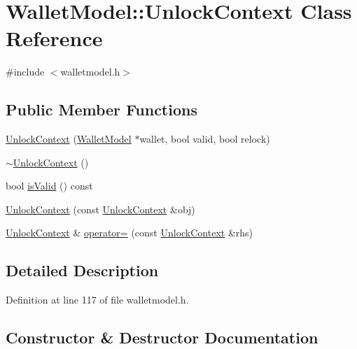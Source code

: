 \hypertarget{class_wallet_model_1_1_unlock_context}{}\section{Wallet\+Model\+:\+:Unlock\+Context Class Reference}
\label{class_wallet_model_1_1_unlock_context}


{\ttfamily \#include $<$walletmodel.\+h$>$}

\subsection*{Public Member Functions}
\begin{DoxyCompactItemize}
\item 
\hyperlink{class_wallet_model_1_1_unlock_context_a1b23753195fd29066fda2bc547c01e52}{Unlock\+Context} (\hyperlink{class_wallet_model}{Wallet\+Model} $\ast$wallet, bool valid, bool relock)
\item 
\hyperlink{class_wallet_model_1_1_unlock_context_aa8d5445b1bc2a13ad8bfc06080b164d4}{$\sim$\+Unlock\+Context} ()
\item 
bool \hyperlink{class_wallet_model_1_1_unlock_context_a473668760a36c5f5c18aae08a7a23e25}{is\+Valid} () const 
\item 
\hyperlink{class_wallet_model_1_1_unlock_context_afad6dc72ce1f4af4989efd2aed155759}{Unlock\+Context} (const \hyperlink{class_wallet_model_1_1_unlock_context}{Unlock\+Context} \&obj)
\item 
\hyperlink{class_wallet_model_1_1_unlock_context}{Unlock\+Context} \& \hyperlink{class_wallet_model_1_1_unlock_context_a8cdc737caa53323e9bff4e22ea20f440}{operator=} (const \hyperlink{class_wallet_model_1_1_unlock_context}{Unlock\+Context} \&rhs)
\end{DoxyCompactItemize}


\subsection{Detailed Description}


Definition at line 117 of file walletmodel.\+h.



\subsection{Constructor \& Destructor Documentation}
\hypertarget{class_wallet_model_1_1_unlock_context_a1b23753195fd29066fda2bc547c01e52}{}
